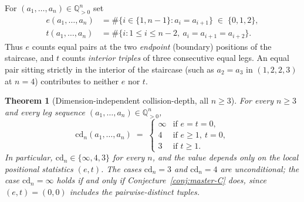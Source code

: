 \documentclass[11pt,a4paper]{article}
\newtheorem{theorem}{Theorem}
\theoremstyle{remark}
\theoremstyle{plain}
\begin{document}
For $(a_1, \ldots, a_n) \in \mathbb{Q}_{>0}^n$ set
\begin{align*}
e(a_1, \ldots, a_n) &= \#\bigl\{ i \in \{1, n-1\} : a_i = a_{i+1}\bigr\}
\;\in\; \{0, 1, 2\}, \\
t(a_1, \ldots, a_n) &= \#\bigl\{ i : 1 \le i \le n-2,\ a_i = a_{i+1} = a_{i+2}\bigr\}.
\end{align*}
Thus $e$ counts equal pairs at the two \emph{endpoint} (boundary)
positions of the staircase, and $t$ counts \emph{interior triples}
of three consecutive equal legs.  An equal pair sitting strictly in
the interior of the staircase (such as $a_2 = a_3$ in
$(1, 2, 2, 3)$ at $n = 4$) contributes to neither $e$ nor $t$.

\begin{theorem}[Dimension-independent collision-depth, all $n \ge 3$]
\label{thm:cd-general}
For every $n \ge 3$ and every leg sequence
$(a_1, \ldots, a_n) \in \mathbb{Q}_{>0}^n$,
\[
\mathrm{cd}_n(a_1, \ldots, a_n) \;=\;
\begin{cases}
\infty & \text{if } e = t = 0, \\
4 & \text{if } e \ge 1,\ t = 0, \\
3 & \text{if } t \ge 1.
\end{cases}
\]
In particular, $\mathrm{cd}_n \in \{\infty, 4, 3\}$ for every $n$, and the value
depends only on the local positional statistics $(e, t)$. The cases
$\mathrm{cd}_n = 3$ and $\mathrm{cd}_n = 4$ are unconditional; the case
$\mathrm{cd}_n = \infty$ holds if and only if Conjecture~\ref{conj:master-C}
does, since $(e,t) = (0,0)$ includes the pairwise-distinct tuples.
\end{theorem}
\end{document}

